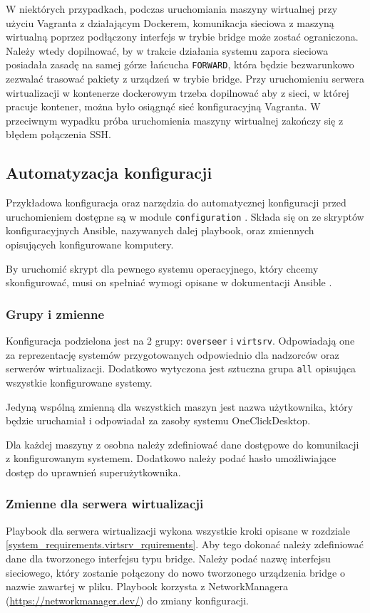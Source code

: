 \documentclass[../opis-rozwiazania.tex]{subfiles}
\begin{document}
W niektórych przypadkach, podczas uruchomiania maszyny wirtualnej przy użyciu Vagranta z działającym Dockerem, komunikacja sieciowa z maszyną wirtualną poprzez podłączony interfejs w trybie bridge może zostać ograniczona.
Należy wtedy dopilnować, by w trakcie działania systemu zapora sieciowa posiadała zasadę na samej górze łańcucha \texttt{FORWARD}, która będzie bezwarunkowo zezwalać trasować pakiety z urządzeń w trybie bridge.
Przy uruchomieniu serwera wirtualizacji w kontenerze dockerowym trzeba dopilnować aby z sieci, w której pracuje kontener, można było osiągnąć sieć konfiguracyjną Vagranta.
W przeciwnym wypadku próba uruchomienia maszyny wirtualnej zakończy się z błędem połączenia SSH.

\subsection{Automatyzacja konfiguracji}
\label{system_requirements.ansible_conf}
Przykładowa konfiguracja oraz narzędzia do automatycznej konfiguracji przed uruchomieniem dostępne są w module \texttt{configuration} \parencite{ocd-configuration}.
Składa się on ze skryptów konfiguracyjnych Ansible, nazywanych dalej playbook, oraz zmiennych opisujących konfigurowane komputery.

By uruchomić skrypt dla pewnego systemu operacyjnego, który chcemy skonfigurować, musi on spełniać wymogi opisane w dokumentacji Ansible \parencite{ansible-connection}.

\subsubsection{Grupy i zmienne}
Konfiguracja podzielona jest na 2 grupy: \texttt{overseer} i \texttt{virtsrv}.
Odpowiadają one za reprezentację systemów przygotowanych odpowiednio dla nadzorców oraz serwerów wirtualizacji.
Dodatkowo wytyczona jest sztuczna grupa \texttt{all} opisująca wszystkie konfigurowane systemy.

Jedyną wspólną zmienną dla wszystkich maszyn jest nazwa użytkownika, który będzie uruchamiał i odpowiadał za zasoby systemu OneClickDesktop.

Dla każdej maszyny z osobna należy zdefiniować dane dostępowe do komunikacji z konfigurowanym systemem. Dodatkowo należy podać hasło umożliwiające dostęp do uprawnień superużytkownika.

\subsubsection{Zmienne dla serwera wirtualizacji}
Playbook dla serwera wirtualizacji wykona wszystkie kroki opisane w rozdziale \ref{system_requirements.virtsrv_rquirements}.
Aby tego dokonać należy zdefiniować dane dla tworzonego interfejsu typu bridge.
Należy podać nazwę interfejsu sieciowego, który zostanie połączony do nowo tworzonego urządzenia bridge o nazwie zawartej w pliku.
Playbook korzysta z NetworkManagera (\url{https://networkmanager.dev/}) do zmiany konfiguracji.
\end{document}
